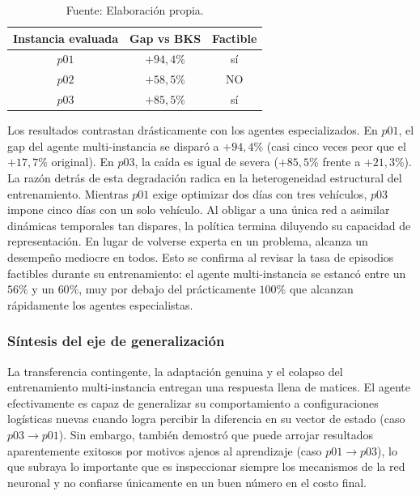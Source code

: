\begin{table}[H]
    \centering
    \caption{\label{tab:multi-instancia} Desempeño del agente entrenado bajo el esquema multi-instancia.}
    \caption*{Fuente: Elaboración propia.}
    \renewcommand{\arraystretch}{1.15}
    \setlength{\tabcolsep}{11pt}
    \begin{tabular}{@{}ccc@{}}
        \toprule
        \textbf{Instancia evaluada} & \textbf{Gap vs BKS} & \textbf{Factible} \\
        \midrule
        $p01$ & $+94{,}4\%$ & sí \\
        $p02$ & $+58{,}5\%$ & NO \\
        $p03$ & $+85{,}5\%$ & sí \\
        \bottomrule
    \end{tabular}
\end{table}

Los resultados contrastan drásticamente con los agentes especializados. En $p01$, el gap del agente multi-instancia se disparó a $+94{,}4\%$ (casi cinco veces peor que el $+17{,}7\%$ original). En $p03$, la caída es igual de severa ($+85{,}5\%$ frente a $+21{,}3\%$). La razón detrás de esta degradación radica en la heterogeneidad estructural del entrenamiento. Mientras $p01$ exige optimizar dos días con tres vehículos, $p03$ impone cinco días con un solo vehículo. Al obligar a una única red a asimilar dinámicas temporales tan dispares, la política termina diluyendo su capacidad de representación. En lugar de volverse experta en un problema, alcanza un desempeño mediocre en todos. Esto se confirma al revisar la tasa de episodios factibles durante su entrenamiento: el agente multi-instancia se estancó entre un $56\%$ y un $60\%$, muy por debajo del prácticamente $100\%$ que alcanzan rápidamente los agentes especialistas.

\subsubsection{Síntesis del eje de generalización}
La transferencia contingente, la adaptación genuina y el colapso del entrenamiento multi-instancia entregan una respuesta llena de matices. El agente efectivamente es capaz de generalizar su comportamiento a configuraciones logísticas nuevas cuando logra percibir la diferencia en su vector de estado (caso $p03 \rightarrow p01$). Sin embargo, también demostró que puede arrojar resultados aparentemente exitosos por motivos ajenos al aprendizaje (caso $p01 \rightarrow p03$), lo que subraya lo importante que es inspeccionar siempre los mecanismos de la red neuronal y no confiarse únicamente en un buen número en el costo final.

